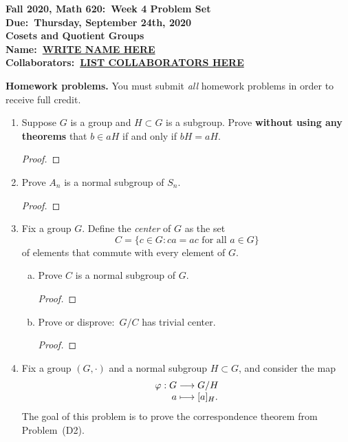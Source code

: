 \documentclass{article}
\theoremstyle{definition}
\numberwithin{equation}{section}
\renewcommand\>{\rangle}
\newcommand\<{\langle}
\newcommand\0{\mathbf{0}}
\begin{document}
\begin{center}
\textbf{Fall 2020, Math 620:\ Week 4 Problem Set} \\
\textbf{Due:\ Thursday, September 24th, 2020} \\
\textbf{Cosets and Quotient Groups} \\
\textbf{Name:\ \underline{WRITE NAME HERE}} \\
\textbf{Collaborators:\ \underline{LIST COLLABORATORS HERE}}
\end{center}


\bigskip
\noindent
\textbf{Homework problems.}
You must submit \emph{all} homework problems in order to receive full credit.  

\begin{enumerate}[(H1)]
\item 
Suppose $G$ is a group and $H \subset G$ is a subgroup.  Prove \textbf{without using any theorems} that $b \in aH$ if and only if $bH = aH$.  

\begin{proof}

\end{proof}


\item 
Prove $A_n$ is a normal subgroup of $S_n$.  

\begin{proof}

\end{proof}


\item 
Fix a group $G$.  Define the \emph{center} of $G$ as the set
$$C = \{c \in G : ca = ac \text{ for all } a \in G\}$$
of elements that commute with every element of $G$.  

\begin{enumerate}[(a)]
\item 
Prove $C$ is a normal subgroup of $G$.  

\begin{proof}

\end{proof}


\item 
Prove or disprove:\ $G/C$ has trivial center.  

\begin{proof}

\end{proof}

\end{enumerate}

\item 
Fix a group $(G, \cdot)$ and a normal subgroup $H \subset G$, and consider the map 
$$\begin{array}{r@{}c@{}l}
\varphi:G &{}\longrightarrow{}& G/H \\
a &{}\longmapsto{}& [a]_H.
\end{array}$$
The goal of this problem is to prove the correspondence theorem from Problem~(D2).  


\end{enumerate}
\end{document}
